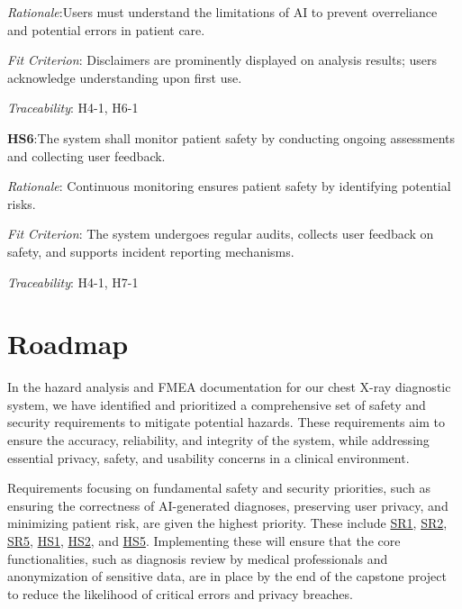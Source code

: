 \documentclass{article}
\begin{document}
\emph{Rationale}:Users must understand the limitations of AI to prevent overreliance and potential errors in patient care.

\vspace{0.2cm}

\emph{Fit Criterion}: Disclaimers are prominently displayed on analysis results; users acknowledge understanding upon first use.

\vspace{0.2cm}

\emph{Traceability}: H4-1, H6-1

\vspace{0.5cm}

\textbf{HS6}:\hypertarget{HS6}{The system shall monitor patient safety by conducting ongoing assessments and collecting user feedback.}
\vspace{0.2cm}

\emph{Rationale}: Continuous monitoring ensures patient safety by identifying potential risks.

\vspace{0.2cm}

\emph{Fit Criterion}: The system undergoes regular audits, collects user feedback on safety, and supports incident reporting mechanisms.

\vspace{0.2cm}

\emph{Traceability}: H4-1, H7-1


\section{Roadmap}

In the hazard analysis and FMEA documentation for our chest X-ray diagnostic system, we have identified and prioritized a comprehensive set of safety and security requirements to mitigate potential hazards. These requirements aim to ensure the accuracy, reliability, and integrity of the system, while addressing essential privacy, safety, and usability concerns in a clinical environment.

\vspace{0.2cm}

\noindent Requirements focusing on fundamental safety and security priorities, such as ensuring the correctness of AI-generated diagnoses, preserving user privacy, and minimizing patient risk, are given the highest priority. These include \hyperlink{SR1}{SR1}, \hyperlink{SR2}{SR2}, \hyperlink{SR5}{SR5}, \hyperlink{HS1}{HS1}, \hyperlink{HS2}{HS2}, and \hyperlink{HS5}{HS5}. Implementing these will ensure that the core functionalities, such as diagnosis review by medical professionals and anonymization of sensitive data, are in place by the end of the capstone project to reduce the likelihood of critical errors and privacy breaches.
\vspace{0.2cm}
\end{document}
